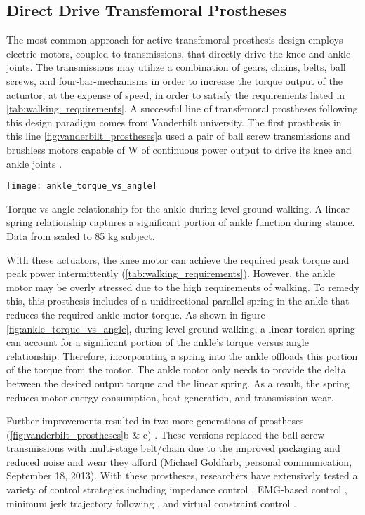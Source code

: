 \subsection{Direct Drive Transfemoral Prostheses}\label{sec:back_direct_drive}
The most common approach for active transfemoral prosthesis design employs
electric motors, coupled to transmissions, that directly drive the knee and
ankle joints. The transmissions may utilize a combination of gears, chains,
belts, ball screws, and four-bar-mechanisms in order to increase the torque
output of the actuator, at the expense of speed, in order to satisfy the
requirements listed in \cref{tab:walking_requirements}. A successful line of
transfemoral prostheses following this design paradigm comes from Vanderbilt
university. The first prosthesis in this line \cref{fig:vanderbilt_prostheses}a
used a pair of ball screw transmissions and brushless motors capable of
\unit[200]{W} of continuous power output to drive its knee and ankle joints
\citep{sup2009preliminary}. 

\begin{marginfigure}
    \centering
    \texttt{[image: ankle\_torque\_vs\_angle]}
    \caption{Torque vs angle relationship for the ankle during level ground
    walking. A linear spring relationship captures a significant portion of
    ankle function during stance. Data from \citet{winter2009biomechanics}
    scaled to 85 kg subject.}
    \label{fig:ankle_torque_vs_angle}
\end{marginfigure}

With these actuators, the knee motor can achieve the required peak torque and
peak power intermittently (\cref{tab:walking_requirements}). However, the ankle
motor may be overly stressed due to the high requirements of walking. To remedy
this, this prosthesis includes of a unidirectional parallel spring in the ankle
that reduces the required ankle motor torque. As shown in figure
\cref{fig:ankle_torque_vs_angle}, during level ground walking, a linear torsion
spring can account for a significant portion of the ankle's torque versus angle
relationship. Therefore, incorporating a spring into the ankle offloads this
portion of the torque from the motor. The ankle motor only needs to provide the
delta between the desired output torque and the linear spring. As a result, the
spring reduces motor energy consumption, heat generation, and transmission wear.


Further improvements resulted in two more generations of prostheses
(\cref{fig:vanderbilt_prostheses}b \& c) \citep{lawson2013control,
lawson2014robotic}. These versions replaced the ball screw transmissions with
multi-stage belt/chain due to the improved packaging and reduced noise and wear
they afford (Michael Goldfarb, personal communication, September 18, 2013). With
these prostheses, researchers have extensively tested a variety of control
strategies including impedance control \citep{sup2009preliminary,
sup2011upslope, lawson2013control, lawson2014robotic}, EMG-based control
\citep{ha2011volitional, varol2010multiclass}, minimum jerk trajectory following
\citep{lenzi2014minimum}, and virtual constraint control
\citep{gregg2014virtual}. 

